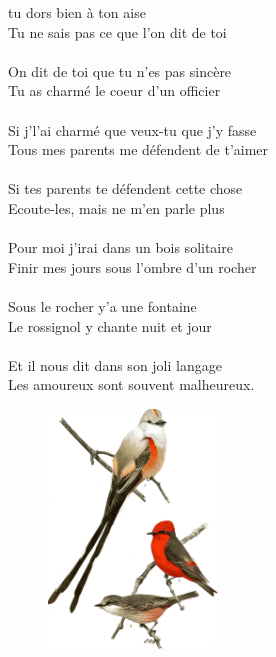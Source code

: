 
 tu dors bien à ton aise
\\Tu ne sais pas ce que l'on dit de toi
\\\\On dit de toi que tu n'es pas sincère
\\Tu as charmé le coeur d'un officier
\\\\Si j'l'ai charmé que veux-tu que j'y fasse
\\Tous mes parents me défendent de t'aimer
\\\\Si tes parents te défendent cette chose
\\Ecoute-les, mais ne m'en parle plus
\\\\Pour moi j'irai dans un bois solitaire
\\Finir mes jours sous l'ombre d'un rocher
\\\\Sous le rocher y'a une fontaine
\\Le rossignol y chante nuit et jour
\\\\Et il nous dit dans son joli langage
\\Les amoureux sont souvent malheureux.

\vspace{0.5cm}
\begin{figure}[h!]
\centering
   \includegraphics[width=0.4\textwidth]{images/brev61.png}
 \end{figure}


\breakpage